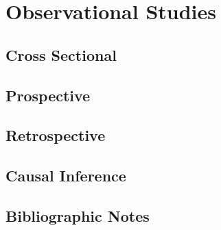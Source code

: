 \chapter{Observational Studies}
\label{ch:observational}


\section{Cross Sectional}
\label{sec:cross_section}


\section{Prospective}
\label{sec:prospective}


\section{Retrospective}
\label{sec:restospective}

\section{Causal Inference}
\label{sec:causal}


\section{Bibliographic Notes}
